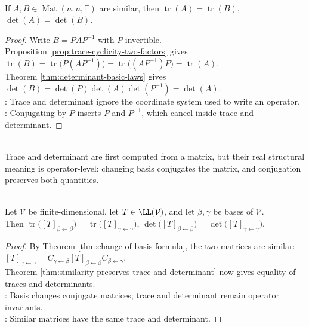 \begin{theorem} \label{thm:similarity-preserves-trace-and-determinant} \\
If $A,B\in\operatorname{Mat}(n,n,\mathbb{F})$ are similar, then $\operatorname{tr}(A)=\operatorname{tr}(B)$, $\det(A)=\det(B)$.
\begin{proof}
Write $B=PAP^{-1}$ with $P$ invertible.\\
Proposition \ref{prop:trace-cyclicity-two-factors} gives $\operatorname{tr}(B)=\operatorname{tr}\bigl(P(AP^{-1})\bigr) =\operatorname{tr}\bigl((AP^{-1})P\bigr) =\operatorname{tr}(A)$.\\
Theorem \ref{thm:determinant-basic-laws} gives $\det(B)=\det(P)\det(A)\det(P^{-1})=\det(A)$.\\
: Trace and determinant ignore the coordinate system used to write an operator.\\
: Conjugating by $P$ inserts $P$ and $P^{-1}$, which cancel inside trace and determinant.
\end{proof}
\end{theorem}

\begin{principle} \label{princ:trace-determinant-coordinate-free} \\
Trace and determinant are first computed from a matrix, but their real structural meaning is operator-level: changing basis conjugates the matrix, and conjugation preserves both quantities.
\end{principle}

\begin{theorem} \label{thm:operator-matrix-trace-determinant-basis-independent} \\
Let $\mathcal{V}$ be finite-dimensional, let $T\in\LL(\mathcal{V})$, and let $\beta,\gamma$ be bases of $\mathcal{V}$.\\
Then $\operatorname{tr}\bigl([T]_{\beta\leftarrow\beta}\bigr) =\operatorname{tr}\bigl([T]_{\gamma\leftarrow\gamma}\bigr)$, $\det\bigl([T]_{\beta\leftarrow\beta}\bigr) =\det\bigl([T]_{\gamma\leftarrow\gamma}\bigr)$.
\begin{proof}
By Theorem \ref{thm:change-of-basis-formula}, the two matrices are similar: $[T]_{\gamma\leftarrow\gamma} =C_{\gamma\leftarrow\beta}[T]_{\beta\leftarrow\beta}C_{\beta\leftarrow\gamma}$.\\
Theorem \ref{thm:similarity-preserves-trace-and-determinant} now gives equality of traces and determinants.\\
: Basis changes conjugate matrices; trace and determinant remain operator invariants.\\
: Similar matrices have the same trace and determinant.
\end{proof}
\end{theorem}

